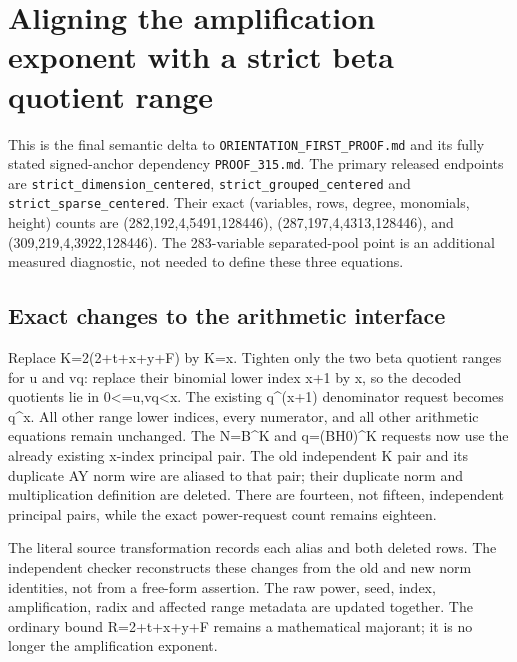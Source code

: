\section{Aligning the amplification exponent with a strict beta quotient range}



This is the final semantic delta to \texttt{ORIENTATION\_\allowbreak{}FIRST\_\allowbreak{}PROOF.md} and its fully stated signed-anchor dependency \texttt{PROOF\_\allowbreak{}315.md}. The primary released endpoints are \texttt{strict\_\allowbreak{}dimension\_\allowbreak{}centered}, \texttt{strict\_\allowbreak{}grouped\_\allowbreak{}centered} and \texttt{strict\_\allowbreak{}sparse\_\allowbreak{}centered}. Their exact (variables, rows, degree, monomials, height) counts are (282,192,4,5491,128446), (287,197,4,4313,128446), and (309,219,4,3922,128446). The 283-variable separated-pool point is an additional measured diagnostic, not needed to define these three equations.



\subsection{Exact changes to the arithmetic interface}



Replace K=\allowbreak{}2(2+\allowbreak{}t+\allowbreak{}x+\allowbreak{}y+\allowbreak{}F) by K=\allowbreak{}x. Tighten only the two beta quotient ranges for u and vq: replace their binomial lower index x+\allowbreak{}1 by x, so the decoded quotients lie in 0\textless{}\allowbreak{}=\allowbreak{}u,vq\textless{}\allowbreak{}x. The existing q\textasciicircum{}\allowbreak{}(x+\allowbreak{}1) denominator request becomes q\textasciicircum{}\allowbreak{}x. All other range lower indices, every numerator, and all other arithmetic equations remain unchanged. The N=\allowbreak{}B\textasciicircum{}\allowbreak{}K and q=\allowbreak{}(B\textasteriskcentered{}\allowbreak{}H0)\textasciicircum{}\allowbreak{}K requests now use the already existing x-index principal pair. The old independent K pair and its duplicate A\textasteriskcentered{}\allowbreak{}Y norm wire are aliased to that pair; their duplicate norm and multiplication definition are deleted. There are fourteen, not fifteen, independent principal pairs, while the exact power-request count remains eighteen.



The literal source transformation records each alias and both deleted rows. The independent checker reconstructs these changes from the old and new norm identities, not from a free-form assertion. The raw power, seed, index, amplification, radix and affected range metadata are updated together. The ordinary bound R=\allowbreak{}2+\allowbreak{}t+\allowbreak{}x+\allowbreak{}y+\allowbreak{}F remains a mathematical majorant; it is no longer the amplification exponent.



